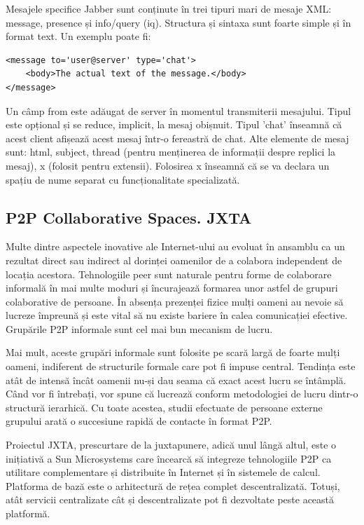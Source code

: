 Mesajele specifice Jabber sunt conținute în trei tipuri mari de mesaje XML:
message, presence și info/query (iq). Structura și sintaxa sunt foarte simple
și în format text. Un exemplu poate fi:

\begin{verbatim}
<message to='user@server' type='chat'>
    <body>The actual text of the message.</body>  
</message>
\end{verbatim}

Un câmp from este adăugat de server în momentul transmiterii mesajului. Tipul
este opțional și se reduce, implicit, la mesaj obișnuit. Tipul 'chat' înseamnă
că acest client afișează acest mesaj într-o fereastră de chat. Alte elemente
de mesaj sunt: html, subject, thread (pentru menținerea de informații despre
replici la mesaj), x (folosit pentru extensii). Folosirea x înseamnă că se va
declara un spațiu de nume separat cu funcționalitate specializată.

\subsection{P2P Collaborative Spaces. JXTA}

Multe dintre aspectele inovative ale Internet-ului au evoluat în ansamblu ca
un rezultat direct sau indirect al dorinței oamenilor de a colabora
independent de locația acestora. Tehnologiile peer sunt naturale pentru forme
de colaborare informală în mai multe moduri și încurajează formarea unor
astfel de grupuri colaborative de persoane. În absența prezenței fizice mulți
oameni au nevoie să lucreze împreună și este vital să nu existe bariere în
calea comunicației efective. Grupările P2P informale sunt cel mai bun mecanism
de lucru.

Mai mult, aceste grupări informale sunt folosite pe scară largă de foarte
mulți oameni, indiferent de structurile formale care pot fi impuse central.
Tendința este atât de intensă încât oamenii nu-și dau seama că exact acest
lucru se întâmplă. Când vor fi întrebați, vor spune că lucrează conform
metodologiei de lucru dintr-o structură ierarhică. Cu toate acestea, studii
efectuate de persoane externe grupului arată o succesiune rapidă de contacte
în format P2P.

Proiectul JXTA, prescurtare de la juxtapunere, adică unul lângă altul, este o
inițiativă a Sun Microsystems care încearcă să integreze tehnologiile P2P ca
utilitare complementare și distribuite în Internet și în sistemele de calcul.
Platforma de bază este o arhitectură de rețea complet descentralizată. Totuși,
atât servicii centralizate cât și descentralizate pot fi dezvoltate peste
această platformă.

